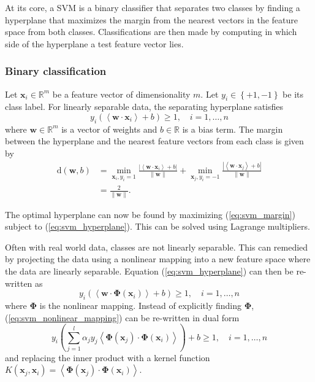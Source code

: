 At its core, a SVM is a binary classifier that separates two classes by finding
a hyperplane that maximizes the margin from the nearest vectors in the feature
space from both classes. Classifications are then made by computing in which
side of the hyperplane a test feature vector lies.

\subsubsection{Binary classification}

Let $\mathbf{x}_i \in \mathbb{R}^m$ be a feature vector of dimensionality $m$.
Let $y_i \in \left\{ +1, -1 \right\}$ be its class label. For linearly separable
data, the separating hyperplane satisfies
\begin{equation}\label{eq:svm_hyperplane}
y_i\left( \left< \mathbf{w} \cdot \mathbf{x}_i \right> + b \right) \ge 1, \hspace{1em}
i = 1,\ldots,n
\end{equation}
where $\mathbf{w} \in \mathbb{R}^m$ is a vector of weights and $b \in
\mathbb{R}$ is a bias term. The margin between the hyperplane and the nearest
feature vectors from each class is given by
\begin{align}
  \text{d}(\mathbf{w},b) &=
  \min_{\mathbf{x}_i,y_i=1}
  \frac{|\left< \mathbf{w} \cdot \mathbf{x}_i \right> + b|}{\|\mathbf{w}\|} +
  \min_{\mathbf{x}_j,y_i=-1}
  \frac{|\left< \mathbf{w} \cdot \mathbf{x}_j \right> + b|}{\|\mathbf{w}\|} \\[0.5em]
                         &= \frac{2}{\|\mathbf{w}\|}. \label{eq:svm_margin}
\end{align}

The optimal hyperplane can now be found by maximizing (\ref{eq:svm_margin})
subject to (\ref{eq:svm_hyperplane}). This can be solved using Lagrange
multipliers.

Often with real world data, classes are not linearly separable. This can
remedied by projecting the data using a nonlinear mapping into a new feature
space where the data are linearly separable. Equation (\ref{eq:svm_hyperplane})
can then be re-written as
\begin{equation}\label{eq:svm_nonlinear_mapping}
y_i\left( \left< \mathbf{w} \cdot \boldsymbol{\Phi}(\mathbf{x}_i) \right> + b \right) \ge 1, \hspace{1em}
i = 1,\ldots,n
\end{equation}
where $\boldsymbol{\Phi}$ is the nonlinear mapping. Instead of explicitly
finding $\boldsymbol{\Phi}$, (\ref{eq:svm_nonlinear_mapping}) can be re-written
in dual form
\begin{equation}
y_i\left(
  \sum_{j=1}^{l} \alpha_j y_j \left<
  \boldsymbol{\Phi}(\mathbf{x}_j) \cdot \boldsymbol{\Phi}(\mathbf{x}_i)
  \right>
\right) + b \ge 1, \hspace{1em} i=1,\ldots,n
\end{equation}
and replacing the inner product with a kernel function
$K(\mathbf{x}_j,\mathbf{x}_i) = \left< \boldsymbol{\Phi}(\mathbf{x}_j) \cdot
\boldsymbol{\Phi}(\mathbf{x}_i) \right>$.

